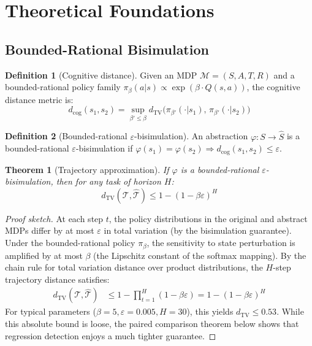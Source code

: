 \documentclass[11pt,twocolumn]{article}
\newtheorem{theorem}{Theorem}
\theoremstyle{definition}
\newtheorem{definition}{Definition}
\newcommand{\tv}{\mathrm{TV}}
\newcommand{\mdp}{\mathcal{M}}
\begin{document}
\section{Theoretical Foundations}
\label{sec:theory}

\subsection{Bounded-Rational Bisimulation}
\label{sec:bisimulation}

\begin{definition}[Cognitive distance]
Given an MDP $\mdp = (S, A, T, R)$ and a bounded-rational policy family $\pi_\beta(a|s) \propto \exp(\beta \cdot Q(s,a))$, the cognitive distance metric is:
\begin{equation}
  d_{\mathrm{cog}}(s_1, s_2) = \sup_{\beta' \leq \beta} d_\tv\!\bigl(\pi_{\beta'}(\cdot|s_1),\, \pi_{\beta'}(\cdot|s_2)\bigr)
\end{equation}
\end{definition}

\begin{definition}[Bounded-rational $\varepsilon$-bisimulation]
An abstraction $\varphi: S \to \hat{S}$ is a bounded-rational $\varepsilon$-bisimulation if $\varphi(s_1) = \varphi(s_2) \Rightarrow d_{\mathrm{cog}}(s_1, s_2) \leq \varepsilon$.
\end{definition}

\begin{theorem}[Trajectory approximation]
\label{thm:trajectory}
If $\varphi$ is a bounded-rational $\varepsilon$-bisimulation, then for any task of horizon $H$:
\begin{equation}
  d_\tv(\mathcal{T}, \hat{\mathcal{T}}) \leq 1 - (1 - \beta\varepsilon)^H
\end{equation}
\end{theorem}

\begin{proof}[Proof sketch]
At each step $t$, the policy distributions in the original and abstract MDPs differ by at most $\varepsilon$ in total variation (by the bisimulation guarantee).
Under the bounded-rational policy $\pi_\beta$, the sensitivity to state perturbation is amplified by at most $\beta$ (the Lipschitz constant of the softmax mapping).
By the chain rule for total variation distance over product distributions, the $H$-step trajectory distance satisfies:
\begin{align*}
d_\tv(\mathcal{T}, \hat{\mathcal{T}}) &\leq 1 - \prod_{t=1}^{H} (1 - \beta\varepsilon) = 1 - (1-\beta\varepsilon)^H
\end{align*}
For typical parameters ($\beta=5, \varepsilon=0.005, H=30$), this yields $d_\tv \leq 0.53$.
While this absolute bound is loose, the paired comparison theorem below shows that regression detection enjoys a much tighter guarantee.
\end{proof}
\end{document}
